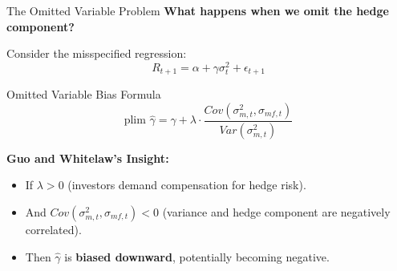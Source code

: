 \documentclass{beamer}
\begin{document}
\begin{frame}{The Omitted Variable Problem}
    \textbf{What happens when we omit the hedge component?}
    
    Consider the misspecified regression:
    \begin{equation}
        R_{t+1} = \alpha + \gamma \sigma_t^2 + \epsilon_{t+1}
    \end{equation}
    
    \begin{block}{Omitted Variable Bias Formula}
        \begin{equation}
            \text{plim } \hat{\gamma} = \gamma + \lambda \cdot \frac{Cov(\sigma_{m,t}^2, \sigma_{mf,t})}{Var(\sigma_{m,t}^2)}
        \end{equation}
    \end{block}
    
    \textbf{Guo and Whitelaw's Insight:}
    \begin{itemize}
        \item If $\lambda > 0$ (investors demand compensation for hedge risk).
        \item And $Cov(\sigma_{m,t}^2, \sigma_{mf,t}) < 0$ (variance and hedge component are negatively correlated).
        \item Then $\hat{\gamma}$ is \textbf{biased downward}, potentially becoming negative.
    \end{itemize}
\end{frame}
\end{document}

